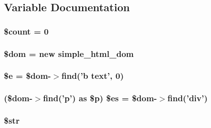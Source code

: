 \subsection{Variable Documentation}
\hypertarget{element__testcase_8php_af789423037bbc89dc7c850e761177570}{
\subsubsection[{\$count}]{\setlength{\rightskip}{0pt plus 5cm}\$count = 0}}\label{element__testcase_8php_af789423037bbc89dc7c850e761177570}
\hypertarget{element__testcase_8php_a46127a794280dd592812c25b62af34b0}{
\subsubsection[{\$dom}]{\setlength{\rightskip}{0pt plus 5cm}\$dom = new {\bf simple\+\_\+html\+\_\+dom}}}\label{element__testcase_8php_a46127a794280dd592812c25b62af34b0}
\hypertarget{element__testcase_8php_ab74076a9b7e1d23d12b9e8d65e60315a}{
\subsubsection[{\$e}]{\setlength{\rightskip}{0pt plus 5cm}\$e = \$dom-\/$>$find('b text', 0)}}\label{element__testcase_8php_ab74076a9b7e1d23d12b9e8d65e60315a}
\hypertarget{element__testcase_8php_a3b7fe8df18180e15ae677b41b1507990}{
\subsubsection[{\$es}]{ (\$dom-\/$>$find('p') as \$p) \$es = \$dom-\/$>$find('div')}}\label{element__testcase_8php_a3b7fe8df18180e15ae677b41b1507990}
\hypertarget{element__testcase_8php_a7542d95618011800c61773127fa625cf}{
\subsubsection[{\$str}]{\setlength{\rightskip}{0pt plus 5cm}\$str}}\label{element__testcase_8php_a7542d95618011800c61773127fa625cf}
